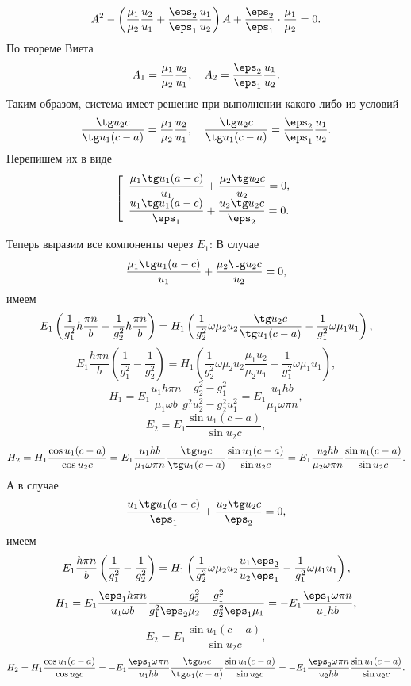 \documentclass[a4paper]{hedsemwork}
\renewcommand{\frac}{\dfrac}
\begin{document}
\[
    A^2 - \left(
    \frac{\mu_1}{\mu_2}\frac{u_2}{u_1} + \frac{\eps_2}{\eps_1}\frac{u_1}{u_2}
    \right)A + \frac{\eps_2}{\eps_1}\cdot\frac{\mu_1}{\mu_2} = 0.
\]
По теореме Виета
\[
    A_1 = \frac{\mu_1}{\mu_2}\frac{u_2}{u_1},\quad
    A_2 = \frac{\eps_2}{\eps_1}\frac{u_1}{u_2}.
\]
Таким образом, система имеет решение при выполнении какого-либо из условий
\[
    \frac{\tg u_2 c}{\tg u_1 (c-a)} =
    \frac{\mu_1}{\mu_2}\frac{u_2}{u_1},\quad
    \frac{\tg u_2 c}{\tg u_1 (c-a)} =
    \frac{\eps_2}{\eps_1}\frac{u_1}{u_2}.
\]
Перепишем их в виде
\[
    \left[
        \begin{array}{l}
            \frac{\mu_1\tg u_1 (a-c)}{u_1} + \frac{\mu_2\tg u_2 c}{u_2} = 0,\\
            \frac{u_1\tg u_1 (a-c)}{\eps_1} + \frac{u_2\tg u_2 c}{\eps_2} = 0.
        \end{array}
    \right.
\]

Теперь выразим все компоненты через \( E_1 \):
В случае
\[
    \frac{\mu_1\tg u_1 (a-c)}{u_1} + \frac{\mu_2\tg u_2 c}{u_2} = 0,
\]
имеем
\[
    E_1\left(\frac{1}{g_1^2} h \frac{\pi n}{b}-
    \frac{1}{g_2^2}h \frac{\pi n}{b}\right) =
    H_1\left(\frac{1}{g_2^2}\omega\mu_2u_2\frac{\tg u_2 c}{\tg u_1 (c-a)}-
    \frac{1}{g_1^2}\omega\mu_1u_1\right),
\]
\[
    E_1\frac{h\pi n}{b}\left(\frac{1}{g_1^2}-\frac{1}{g_2^2}\right)=
    H_1\left(\frac{1}{g_2^2}\omega\mu_2u_2\frac{\mu_1u_2}{\mu_2u_1}-
    \frac{1}{g_1^2}\omega\mu_1u_1\right),
\]
\[
    H_1 = E_1\frac{u_1h\pi n}{\mu_1\omega b}
    \frac{g_2^2-g_1^2}{g_1^2u_2^2 - g_2^2u_1^2} =
    E_1\frac{u_1hb}{\mu_1\omega\pi n},
\]
\[
    E_2 = E_1\frac{\sin u_1(c-a)}{\sin u_2 c},
\]
\[
    H_2 = H_1 \frac{\cos u_1(c-a)}{\cos u_2 c} =
    E_1\frac{u_1hb}{\mu_1\omega\pi n}\frac{\tg u_2c}{\tg u_1(c-a)}
    \frac{\sin u_1(c-a)}{\sin u_2 c} = E_1\frac{u_2hb}{\mu_2\omega\pi n}
    \frac{\sin u_1(c-a)}{\sin u_2 c}.
\]
А в случае
\[
    \frac{u_1\tg u_1 (a-c)}{\eps_1} + \frac{u_2\tg u_2 c}{\eps_2} = 0,
\]
имеем
\[
    E_1\frac{h\pi n}{b}\left(\frac{1}{g_1^2}-\frac{1}{g_2^2}\right)=
    H_1\left(\frac{1}{g_2^2}\omega\mu_2u_2\frac{u_1\eps_2}{u_2\eps_1}-
    \frac{1}{g_1^2}\omega\mu_1u_1\right),
\]
\[
    H_1 = E_1\frac{\eps_1h\pi n}{u_1\omega b}
    \frac{g_2^2-g_1^2}{g_1^2\eps_2\mu_2 - g_2^2\eps_1\mu_1} =
    -E_1\frac{\eps_1\omega\pi n}{u_1hb},
\]
\[
    E_2 = E_1\frac{\sin u_1(c-a)}{\sin u_2 c},
\]
\[
    H_2 = H_1 \frac{\cos u_1(c-a)}{\cos u_2 c} =
    -E_1\frac{\eps_1\omega\pi n}{u_1hb}\frac{\tg u_2c}{\tg u_1(c-a)}
    \frac{\sin u_1(c-a)}{\sin u_2 c} = -E_1\frac{\eps_2\omega\pi n}{u_2hb}
    \frac{\sin u_1(c-a)}{\sin u_2 c}.
\]
\end{document}
